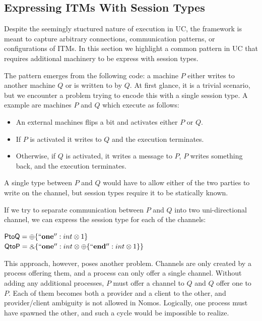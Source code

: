 \subsection{Expressing ITMs With Session Types}
Despite the seemingly stuctured nature of execution in UC, the framework is meant to capture arbitrary connections, communication patterns, or configurations of ITMs. 
In this section we highlight a common pattern in UC that requires additional machinery to be express with session types.

The pattern emerges from the following code: a machine $P$ either writes to another machine $Q$ or is written to by $Q$. 
At first glance, it is a trivial scenario, but we encounter a problem trying to encode this with a single session type.
A example are machines $P$ and $Q$ which execute as follows:
\begin{itemize}
	\item An external machines flips a bit and activates either $P$ or $Q$.
	\item If $P$ is activated it writes to $Q$ and the execution terminates. 
	\item Otherwise, if $Q$ is activated, it writes a message to $P$, $P$ writes something back, and the execution terminates.
\end{itemize}
A single type between $P$ and $Q$ would have to allow either of the two parties to write on the channel, but session types require it to be statically known.

If we try to separate communication between $P$ and $Q$ into two uni-directional channel, we can express the session type for each of the channels:
\begin{center}
\parbox{0cm}{
\begin{tabbing}
$\mathsf{PtoQ} = \oplus \{ \mathbf{``one''}: int \otimes 1 \}$ \\
$\mathsf{QtoP} = \mathbin{\binampersand} \{ \mathbf{``one''}: int \otimes \oplus \{ \mathbf{``end''}: int \otimes 1 \} \}$
\end{tabbing}}
\end{center}

This approach, however, poses another problem. 
Channels are only created by a process offering them, and a process can only offer a single channel.
Without adding any additional processes, $P$ must offer a channel to $Q$ and $Q$ offer one to $P$. 
Each of them becomes both a provider and a client to the other, and provider/client ambiguity is not allowed in Nomos. 
Logically, one process must have spawned the other, and such a cycle would be impossible to realize.

